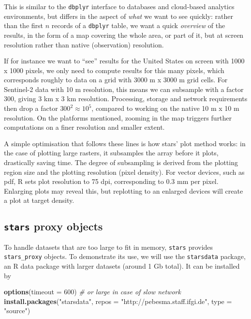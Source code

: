 \documentclass[]{book}
\newenvironment{Shaded}{\begin{snugshade}}{\end{snugshade}}
\newcommand{\CommentTok}[1]{\textcolor[rgb]{0.56,0.35,0.01}{\textit{#1}}}
\newcommand{\DataTypeTok}[1]{\textcolor[rgb]{0.13,0.29,0.53}{#1}}
\newcommand{\DecValTok}[1]{\textcolor[rgb]{0.00,0.00,0.81}{#1}}
\newcommand{\KeywordTok}[1]{\textcolor[rgb]{0.13,0.29,0.53}{\textbf{#1}}}
\newcommand{\NormalTok}[1]{#1}
\newcommand{\StringTok}[1]{\textcolor[rgb]{0.31,0.60,0.02}{#1}}
\begin{document}
This is similar to the \texttt{dbplyr} interface to databases and
cloud-based analytics environments, but differs in the aspect of
\emph{what} we want to see quickly: rather than the first \(n\) records
of a \texttt{dbplyr} table, we want a quick \emph{overview} of the results,
in the form of a map covering the whole area, or part of it, but
at screen resolution rather than native (observation) resolution.

If for instance we want to ``see'' results for the United States on
screen with 1000 x 1000 pixels, we only need to compute results
for this many pixels, which corresponds roughly to data
on a grid with 3000 m x 3000 m grid cells. For Sentinel-2
data with 10 m resolution, this means we can subsample with
a factor 300, giving 3 km x 3 km resolution. Processing,
storage and network requirements then drop a factor \(300^2 \approx 10^5\), compared
to working on the native 10 m x 10 m resolution. On the platforms
mentioned, zooming in the map triggers further computations on a
finer resolution and smaller extent.

A simple optimisation that follows these lines is how stars' plot
method works: in the case of plotting large rasters, it subsamples
the array before it plots, drastically saving time. The degree
of subsampling is derived from the plotting region size and the
plotting resolution (pixel density). For vector devices, such as pdf,
R sets plot resolution to 75 dpi, corresponding to 0.3 mm per pixel.
Enlarging plots may reveal this, but replotting to an enlarged
devices will create a plot at target density.

\hypertarget{stars-proxy-objects}{%
\subsection{\texorpdfstring{\texttt{stars} proxy objects}{stars proxy objects}}\label{stars-proxy-objects}}

To handle datasets that are too large to fit in memory, \texttt{stars}
provides \texttt{stars\_proxy} objects. To demonstrate its use, we will
use the \texttt{starsdata} package, an R data package with larger datasets
(around 1 Gb total). It can be installed by

\begin{Shaded}
\begin{Highlighting}[]
\KeywordTok{options}\NormalTok{(}\DataTypeTok{timeout =} \DecValTok{600}\NormalTok{) }\CommentTok{# or large in case of slow network}
\KeywordTok{install.packages}\NormalTok{(}\StringTok{"starsdata"}\NormalTok{, }\DataTypeTok{repos =} \StringTok{"http://pebesma.staff.ifgi.de"}\NormalTok{, }
    \DataTypeTok{type =} \StringTok{"source"}\NormalTok{)}
\end{Highlighting}
\end{Shaded}
\end{document}
